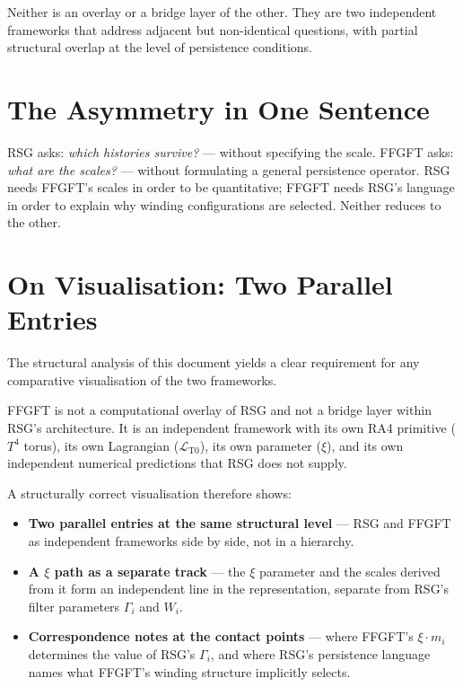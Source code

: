 Neither is an overlay or a bridge layer of the other. They are two
independent frameworks that address adjacent but non-identical questions,
with partial structural overlap at the level of persistence conditions.

\section{The Asymmetry in One Sentence}

\begin{keyresult}
RSG asks: \emph{which histories survive?} — without specifying the scale.
FFGFT asks: \emph{what are the scales?} — without formulating a general
persistence operator. RSG needs FFGFT's scales in order to be quantitative;
FFGFT needs RSG's language in order to explain why winding configurations
are selected. Neither reduces to the other.
\end{keyresult}

\section{On Visualisation: Two Parallel Entries}

The structural analysis of this document yields a clear requirement for
any comparative visualisation of the two frameworks.

FFGFT is not a computational overlay of RSG and not a bridge layer within
RSG's architecture. It is an independent framework with its own RA4
primitive ($T^4$ torus), its own Lagrangian ($\mathcal{L}_{\text{T0}}$),
its own parameter ($\xi$), and its own independent numerical predictions
that RSG does not supply.

A structurally correct visualisation therefore shows:

\begin{itemize}
  \item \textbf{Two parallel entries at the same structural level} —
        RSG and FFGFT as independent frameworks side by side, not
        in a hierarchy.
  \item \textbf{A $\xi$ path as a separate track} — the $\xi$ parameter
        and the scales derived from it form an independent line in the
        representation, separate from RSG's filter parameters
        $\Gamma_i$ and $W_i$.
  \item \textbf{Correspondence notes at the contact points} — where
        FFGFT's $\xi \cdot m_i$ determines the value of RSG's $\Gamma_i$,
        and where RSG's persistence language names what FFGFT's winding
        structure implicitly selects.
\end{itemize}

